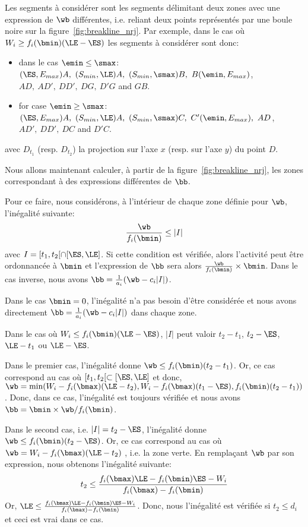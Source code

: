 Les segments à considérer sont les segments délimitant deux zones avec
une expression de $\wb$ différentes, i.e. reliant deux points
représentés par une boule noire sur la
figure~\ref{fig:breakline_nrj}. Par exemple, dans le cas où $W_i \ge
f_i(\bmin)(\LE-\ES)$ les segments à considérer sont donc:
\begin{itemize}
\item dans le cas $\emin \le \smax$: $(\ES ,E_{max})A,\ (S_{min},
  \LE)A,\ (S_{min},\smax)B,\ B(\emin,E_{max})$,  $AD,\ AD',\
  DD' ,\ DG,\ D'G$ and $GB$.
\item for case $\emin\ge \smax$: $(\ES ,E_{max})A,\ (S_{min},
  \LE)A,\ (S_{min},\smax)C,\ C'(\emin,E_{max}),\ AD$, $ AD',\
  DD' ,\ DC$ and $D'C$.
\end{itemize}
avec $D_{t_1}$ (resp. $D_{t_2}$) la projection sur l'axe $x$
(resp. sur l'axe $y$) du point $D$.


Nous allons maintenant calculer, à partir de la
figure~\ref{fig:breakline_nrj}, les zones correspondant à des
expressions différentes de $\bb$. 

Pour ce faire, nous considérons, à l'intérieur de chaque zone définie
pour $\wb$, l'inégalité suivante: 
\[ \frac{\wb}{f_i(\bmin)} \le |I|\]
avec $I=[t_1,t_2[ \cap [\ES,\LE]$. Si cette condition est vérifiée,
alors l'activité peut être ordonnancée à $\bmin$ et l'expression de
$\bb$ sera alors $\frac{\wb}{f_i(\bmin)}\times \bmin$. Dans le cas
inverse, nous avons $\bb=\frac{1}{a_i}(\wb-c_i|I|)$. 

Dans le cas $\bmin=0$, l'inégalité n'a pas besoin d'être considérée et
nous avons directement $\bb=\frac{1}{a_i}(\wb-c_i|I|)$ dans chaque
zone. 

Dans le cas où $W_i\le f_i(\bmin)(\LE-\ES)$, $|I|$ peut valoir
$t_2-t_1$, $t_2-\ES$, $\LE-t_1$ ou $\LE-\ES$. 

Dans le premier cas,
l'inégalité donne $\wb \le f_i(\bmin)(t_2-t_1)$. Or, ce cas correspond
au cas où $[t_1,t_2[ \subset [\ES,\LE]$ et donc, $\wb=\min(W_i -
f_i(\bmax)(\LE-t_2), W_i - f_i(\bmax)(t_1-\ES),
f_i(\bmin)(t_2-t_1))$. Donc, dans ce cas, l'inégalité est toujours
vérifiée et nous avons $\bb = \bmin \times \wb/f_i(\bmin)$. 

Dans le second cas,
i.e. $|I|=t_2-\ES$, l'inégalité donne $\wb \le
f_i(\bmin)(t_2-\ES)$. Or, ce cas correspond au cas où $\wb = W_i -
f_i(\bmax)(\LE -t_2)$ , i.e. la zone verte. En remplaçant $\wb$ par
son expression, nous obtenons l'inégalité suivante: 
\[t_2 \le \frac{f_i(\bmax)\LE - f_i(\bmin)\ES - W_i }{f_i(\bmax) -
    f_i(\bmin)} \]
Or, $\LE  \le \frac{f_i(\bmax)\LE - f_i(\bmin)\ES - W_i }{f_i(\bmax) -
  f_i(\bmin)}$. Donc, nous l'inégalité est vérifiée si $t_2 \le d_i$
et ceci est vrai dans ce cas. 

